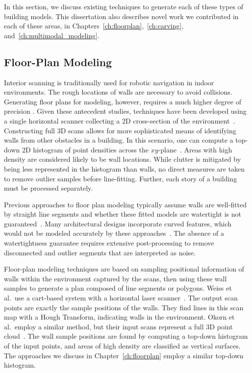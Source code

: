 \documentclass[12pt,onecolumn,oneside]{book}
\begin{document}
In this section, we discuss existing techniques to generate each of these types of building models.  This dissertation also describes novel work we contributed in each of these areas, in Chapters~\ref{ch:floorplan},~\ref{ch:carving}, and~\ref{ch:multimodal_modeling}.

\subsection{Floor-Plan Modeling}
\label{ssec:background_floorplan}

Interior scanning is traditionally used for robotic navigation in indoor environments.  The rough locations of walls are necessary to avoid collisions.  Generating floor plans for modeling, however, requires a much higher degree of precision \cite{Okorn09}.  Given these antecedent studies, techniques have been developed using a single horizontal scanner collecting a 2D cross-section of the environment~\cite{Weiss05}.  Constructing full 3D scans allows for more sophisticated means of identifying walls from other obstacles in a building.  In this scenario, one can compute a top-down 2D histogram of point densities across the $xy$-plane~\cite{Okorn09}.  Areas with high density are considered likely to be wall locations.  While clutter is mitigated by being less represented in the histogram than walls, no direct measures are taken to remove outlier samples before line-fitting.  Further, each story of a building must be processed separately.

Previous approaches to floor plan modeling typically assume walls are well-fitted by straight line segments and whether these fitted models are watertight is not guaranteed~\cite{Nuchter03, Okorn09, Weiss05}.  Many architectural designs incorporate curved features, which would not be modeled accurately by these approaches~\cite{Castles07,Turner12}. The absence of a watertightness guarantee requires extensive post-processing to remove disconnected and outlier segments that are interpreted as noise.

Floor-plan modeling techniques are based on sampling positional information of walls within the environment captured by the scans, then using these wall samples to generate a plan composed of line segments or polygons.  Weiss et al.\ use a cart-based system with a horizontal laser scanner~\cite{Weiss05}.  The output scan points are exactly the sample positions of the walls.  They find lines in this scan map with a Hough Transform, indicating walls in the environment.  Okorn et al.\ employ a similar method, but their input scans represent a full 3D point cloud~\cite{Okorn09}.  The wall sample positions are found by computing a top-down histogram of the input points, and areas of high density are classified as vertical surfaces.  The approaches we discuss in Chapter~\ref{ch:floorplan} employ a similar top-down histogram.  
\end{document}

